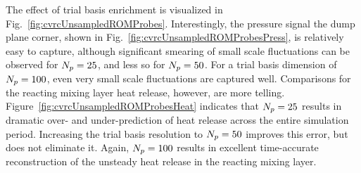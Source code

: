 The effect of trial basis enrichment is visualized in Fig.~\ref{fig:cvrcUnsampledROMProbes}. Interestingly, the pressure signal the dump plane corner, shown in Fig.~\ref{fig:cvrcUnsampledROMProbesPress}, is relatively easy to capture, although significant smearing of small scale fluctuations can be observed for $N_p = 25$, and less so for $N_p = 50$. For a trial basis dimension of $N_p = 100$, even very small scale fluctuations are captured well. Comparisons for the reacting mixing layer heat release, however, are more telling. Figure~\ref{fig:cvrcUnsampledROMProbesHeat} indicates that $N_p = 25$ results in dramatic over- and under-prediction of heat release across the entire simulation period. Increasing the trial basis resolution to $N_p = 50$ improves this error, but does not eliminate it. Again, $N_p = 100$ results in excellent time-accurate reconstruction of the unsteady heat release in the reacting mixing layer.

